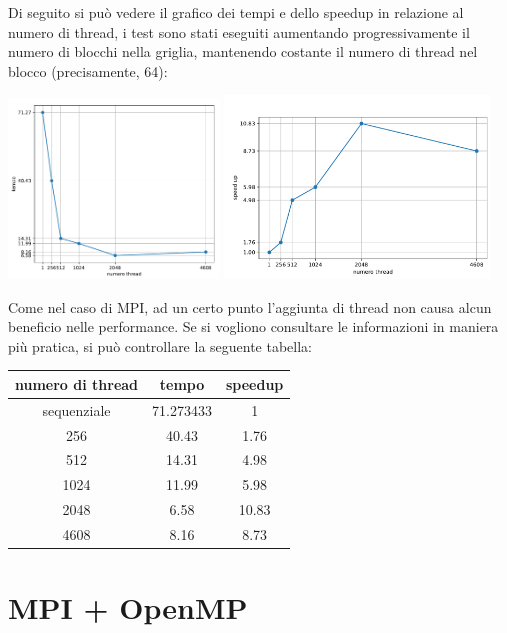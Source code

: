 \documentclass[12pt,openany]{report}
\begin{document}
Di seguito si può vedere il grafico dei tempi e dello speedup in relazione al numero di thread, i test sono stati eseguiti aumentando progressivamente il numero di blocchi nella griglia, mantenendo costante il numero di thread nel blocco (precisamente, 64):
\begin{center}
    \includegraphics[width=0.42\textwidth ]{images/tempiCUDA.pdf}
    \includegraphics[width=0.53\textwidth ]{images/speedupCUDA.pdf}
\end{center}\newpage
Come nel caso di MPI, ad un certo punto l'aggiunta di thread non causa alcun beneficio nelle performance. Se si vogliono consultare le informazioni in maniera più pratica, si può controllare la seguente tabella:
\begin{center}
    \begin{tabular}{|c|c|c|}
        \hline
        \rowcolor[HTML]{EFEFEF} 
        numero di thread & tempo     & speedup \\ \hline
        sequenziale      & 71.273433 & 1       \\ \hline
        256              & 40.43     & 1.76    \\ \hline
        512              & 14.31     & 4.98    \\ \hline
        1024             & 11.99     & 5.98    \\ \hline
        2048             & 6.58      & 10.83   \\ \hline
        4608             & 8.16      & 8.73    \\ \hline
        \end{tabular}
\end{center}
\newpage 
\section{MPI + OpenMP}
\end{document}
